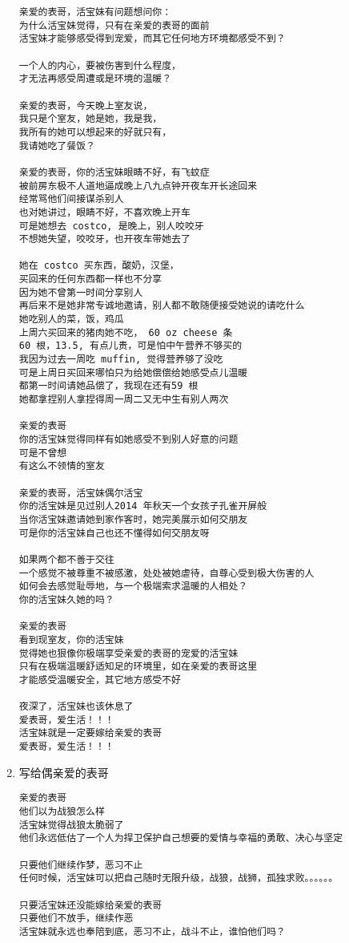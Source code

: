 \documentclass[9pt, b5paper]{article}
\begin{document}
\begin{enumerate}
\begin{verbatim}
亲爱的表哥，活宝妹有问题想问你：
为什么活宝妹觉得，只有在亲爱的表哥的面前
活宝妹才能够感受得到宠爱，而其它任何地方环境都感受不到？

一个人的内心，要被伤害到什么程度，
才无法再感受周遭或是环境的温暖？

亲爱的表哥，今天晚上室友说，
我只是个室友，她是她，我是我，
我所有的她可以想起来的好就只有，
我请她吃了餐饭？

亲爱的表哥，你的活宝妹眼睛不好，有飞蚊症
被前房东极不人道地逼成晚上八九点钟开夜车开长途回来
经常骂他们间接谋杀别人
也对她讲过，眼睛不好，不喜欢晚上开车
可是她想去 costco, 是晚上，别人咬咬牙
不想她失望，咬咬牙，也开夜车带她去了

她在 costco 买东西，酸奶，汉堡，
买回来的任何东西都一样也不分享
因为她不曾第一时间分享别人
再后来不是她非常专诚地邀请，别人都不敢随便接受她说的请吃什么
她吃别人的菜，饭，鸡瓜
上周六买回来的猪肉她不吃， 60 oz cheese 条
60 根，13.5, 有点儿贵，可是怕中午营养不够买的
我因为过去一周吃 muffin, 觉得营养够了没吃
可是上周日买回来哪怕只为给她偿偿给她感受点儿温暖
都第一时间请她品偿了，我现在还有59 根
她都拿捏别人拿捏得周一周二又无中生有别人两次

亲爱的表哥
你的活宝妹觉得同样有如她感受不到别人好意的问题
可是不曾想
有这么不领情的室友

亲爱的表哥，活宝妹偶尔活宝 
你的活宝妹是见过别人2014 年秋天一个女孩子孔雀开屏般
当你活宝妹邀请她到家作客时，她完美展示如何交朋友
可是你的活宝妹自己也还不懂得如何交朋友呀

如果两个都不善于交往
一个感觉不被尊重不被感激，处处被她虐待，自尊心受到极大伤害的人
如何会去感觉耻辱地，与一个极端索求温暖的人相处？
你的活宝妹久她的吗？

亲爱的表哥
看到现室友，你的活宝妹
觉得她也狠像你极端享受亲爱的表哥的宠爱的活宝妹
只有在极端温暖舒适知足的环境里，如在亲爱的表哥这里
才能感受温暖安全，其它地方感受不好

夜深了，活宝妹也该休息了
爱表哥，爱生活！！！
活宝妹就是一定要嫁给亲爱的表哥
爱表哥，爱生活！！！
\end{verbatim}
\item 写给偶亲爱的表哥
\label{sec-3-2-4-5}
\begin{verbatim}
亲爱的表哥
他们以为战狼怎么样
活宝妹觉得战狼太脆弱了
他们永远低估了一个人为捍卫保护自己想要的爱情与幸福的勇敢、决心与坚定

只要他们继续作梦，恶习不止
任何时候，活宝妹可以把自己随时无限升级，战狼，战狮，孤独求败。。。。。。

只要活宝妹还没能嫁给亲爱的表哥
只要他们不放手，继续作恶
活宝妹就永远也奉陪到底，恶习不止，战斗不止，谁怕他们吗？


\end{verbatim}
\end{enumerate}
\end{document}
